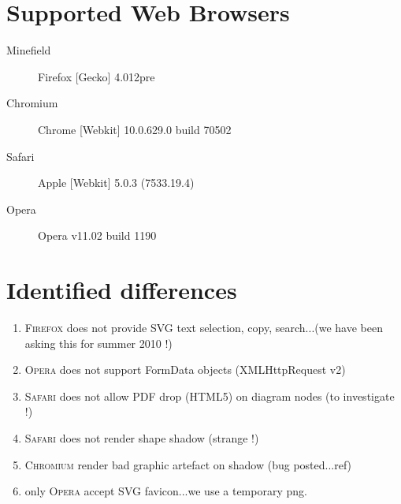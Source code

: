 \documentclass{article}
\newcommand{\ff}{\textsc{Firefox}\xspace}
\newcommand{\ch}{\textsc{Chromium}\xspace}
\newcommand{\sa}{\textsc{Safari}\xspace}
\newcommand{\op}{\textsc{Opera}\xspace}
\begin{document}
\section{Supported Web Browsers}
\date{\today}
\begin{description}
\item[Minefield] Firefox [Gecko] 4.012pre
\item[Chromium] Chrome [Webkit] 10.0.629.0 build 70502
\item[Safari] Apple [Webkit] 5.0.3 (7533.19.4)
\item[Opera] Opera v11.02 build 1190
\end{description}

\section{Identified differences}
\begin{enumerate}
\item \ff does not provide SVG text selection, copy, search...(we have been asking this for summer 2010 !)
\item \op does not support FormData objects (XMLHttpRequest v2)
\item \sa does not allow PDF drop (HTML5) on diagram nodes (to investigate !)
\item \sa does not render shape shadow (strange !)
\item \ch render bad graphic artefact on shadow (bug posted...ref)
\item only \op accept SVG favicon...we use a temporary png. 

\end{enumerate}
\end{document}
